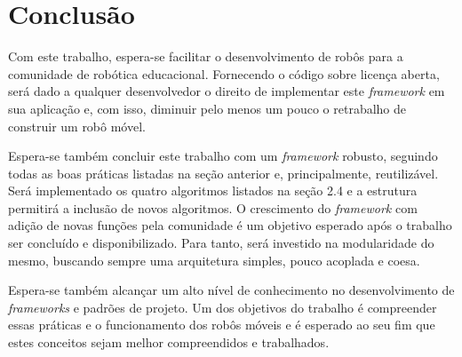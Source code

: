 \chapter[Conclusão]{Conclusão}

Com este trabalho, espera-se facilitar o desenvolvimento de robôs para a comunidade de robótica educacional. Fornecendo o código sobre licença aberta, será dado a qualquer desenvolvedor o direito de implementar este \textit{framework} em sua aplicação e, com isso, diminuir pelo menos um pouco o retrabalho de construir um robô móvel.

Espera-se também concluir este trabalho com um \textit{framework} robusto, seguindo todas as boas práticas listadas na seção anterior e, principalmente, reutilizável. Será implementado os quatro algoritmos listados na seção 2.4 e a estrutura permitirá a inclusão de novos algoritmos. O crescimento do \textit{framework} com adição de novas funções pela comunidade é um objetivo esperado após o trabalho ser concluído e disponibilizado. Para tanto, será investido na modularidade do mesmo, buscando sempre uma arquitetura simples, pouco acoplada e coesa.

Espera-se também alcançar um alto nível de conhecimento no desenvolvimento de \textit{frameworks} e padrões de projeto. Um dos objetivos do trabalho é compreender essas práticas e o funcionamento dos robôs móveis e é esperado ao seu fim que estes conceitos sejam melhor compreendidos e trabalhados.